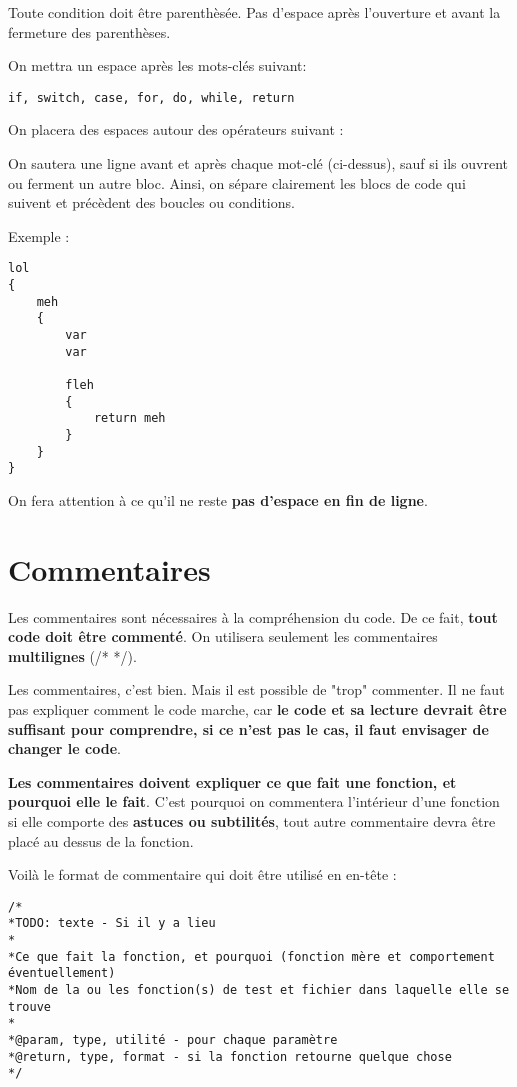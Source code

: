 \documentclass[a4paper, titlepage, oneside]{book}
\begin{document}
Toute condition doit être parenthèsée. Pas d'espace après l'ouverture et avant la fermeture des parenthèses. 

On mettra un espace après les mots-clés suivant:

\texttt{if, switch, case, for, do, while, return}

On placera des espaces autour des opérateurs suivant :


On sautera une ligne avant et après chaque mot-clé (ci-dessus), sauf si ils ouvrent ou ferment un autre bloc. Ainsi, on sépare clairement les blocs de code qui suivent et précèdent des boucles ou conditions.

Exemple :\\
\begin{verbatim}
lol
{
	meh
	{
		var
		var
		
		fleh
		{
			return meh
		}
	}
}
\end{verbatim}

On fera attention à ce qu'il ne reste \textbf{pas d'espace en fin de ligne}.

\chapter{Commentaires}

Les commentaires sont nécessaires à la compréhension du code. De ce fait, \textbf{tout code doit être commenté}. On utilisera seulement les commentaires \textbf{multilignes} (/* */).

Les commentaires, c'est bien. Mais il est possible de "trop" commenter. Il ne faut pas expliquer comment le code marche, car \textbf{le code et sa lecture devrait être suffisant pour comprendre, si ce n'est pas le cas, il faut envisager de changer le code}.

\textbf{Les commentaires doivent expliquer ce que fait une fonction, et pourquoi elle le fait}. C'est pourquoi on commentera l'intérieur d'une fonction si elle comporte des \textbf{astuces ou subtilités}, tout autre commentaire devra être placé au dessus de la fonction.

Voilà le format de commentaire qui doit être utilisé en en-tête :

\begin{verbatim}
/*
*TODO: texte - Si il y a lieu
*
*Ce que fait la fonction, et pourquoi (fonction mère et comportement éventuellement)
*Nom de la ou les fonction(s) de test et fichier dans laquelle elle se trouve
*
*@param, type, utilité - pour chaque paramètre
*@return, type, format - si la fonction retourne quelque chose
*/
\end{verbatim}
\end{document}
